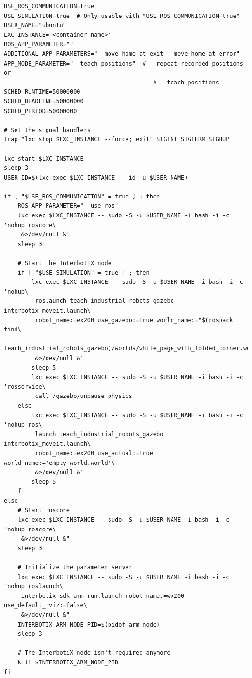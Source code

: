 \begin{lstlisting}[style=bash, caption={Script zum Starten der Roboter-Gesten-Anwendung}, label={lst:start_script_for_app}]
USE_ROS_COMMUNICATION=true
USE_SIMULATION=true  # Only usable with "USE_ROS_COMMUNICATION=true"
USER_NAME="ubuntu"
LXC_INSTANCE="<container name>"
ROS_APP_PARAMETER=""
ADDITIONAL_APP_PARAMETERS="--move-home-at-exit --move-home-at-error"
APP_MODE_PARAMETER="--teach-positions"  # --repeat-recorded-positions or
                                           # --teach-positions
SCHED_RUNTIME=50000000
SCHED_DEADLINE=50000000
SCHED_PERIOD=50000000

# Set the signal handlers
trap "lxc stop $LXC_INSTANCE --force; exit" SIGINT SIGTERM SIGHUP

lxc start $LXC_INSTANCE
sleep 3
USER_ID=$(lxc exec $LXC_INSTANCE -- id -u $USER_NAME)

if [ "$USE_ROS_COMMUNICATION" = true ] ; then
    ROS_APP_PARAMETER="--use-ros"
    lxc exec $LXC_INSTANCE -- sudo -S -u $USER_NAME -i bash -i -c 'nohup roscore\
     &>/dev/null &'
    sleep 3

    # Start the InterbotiX node
    if [ "$USE_SIMULATION" = true ] ; then
        lxc exec $LXC_INSTANCE -- sudo -S -u $USER_NAME -i bash -i -c 'nohup\
         roslaunch teach_industrial_robots_gazebo interbotix_moveit.launch\
         robot_name:=wx200 use_gazebo:=true world_name:="$(rospack find\
         teach_industrial_robots_gazebo)/worlds/white_page_with_folded_corner.world"\
         &>/dev/null &'
        sleep 5
        lxc exec $LXC_INSTANCE -- sudo -S -u $USER_NAME -i bash -i -c 'rosservice\
         call /gazebo/unpause_physics'
    else
        lxc exec $LXC_INSTANCE -- sudo -S -u $USER_NAME -i bash -i -c 'nohup ros\
         launch teach_industrial_robots_gazebo interbotix_moveit.launch\
         robot_name:=wx200 use_actual:=true world_name:="empty_world.world"\
         &>/dev/null &'
        sleep 5
    fi
else
    # Start roscore
    lxc exec $LXC_INSTANCE -- sudo -S -u $USER_NAME -i bash -i -c "nohup roscore\
     &>/dev/null &"
    sleep 3

    # Initialize the parameter server
    lxc exec $LXC_INSTANCE -- sudo -S -u $USER_NAME -i bash -i -c "nohup roslaunch\
     interbotix_sdk arm_run.launch robot_name:=wx200 use_default_rviz:=false\
     &>/dev/null &"
    INTERBOTIX_ARM_NODE_PID=$(pidof arm_node)
    sleep 3

    # The InterbotiX node isn't required anymore
    kill $INTERBOTIX_ARM_NODE_PID
fi


\end{lstlisting}

